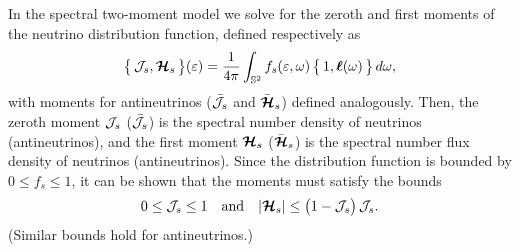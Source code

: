 \documentclass[12pt]{article}
\begin{document}
In the spectral two-moment model we solve for the zeroth and first moments of the neutrino distribution function, defined respectively as
\begin{equation}
  \big\{\,\mathcal{J}_{s},\boldsymbol{\mathcal{H}}_{s}\,\big\}(\varepsilon)=\frac{1}{4\pi}\int_{\mathbb{S}^{2}}f_{s}(\varepsilon,\omega)\,\big\{\,1,\boldsymbol{\ell}(\omega)\,\big\}\,d\omega,
\end{equation}
with moments for antineutrinos ($\bar{\mathcal{J}}_{s}$ and $\bar{\boldsymbol{\mathcal{H}}}_{s}$) defined analogously.  
Then, the zeroth moment $\mathcal{J}_{s}$ ($\bar{\mathcal{J}}_{s}$) is the spectral number density of neutrinos (antineutrinos), and the first moment $\boldsymbol{\mathcal{H}}_{s}$ ($\bar{\boldsymbol{\mathcal{H}}}_{s}$) is the spectral number flux density of neutrinos (antineutrinos).  
Since the distribution function is bounded by $0\le f_{s}\le1$, it can be shown that the moments must satisfy the bounds
\begin{equation}
  0\le\mathcal{J}_{s}\le1
  \quad\text{and}\quad
  |\boldsymbol{\mathcal{H}}_{s}|\le\big(1-\mathcal{J}_{s}\big)\,\mathcal{J}_{s}.  
\end{equation}
(Similar bounds hold for antineutrinos.)
\end{document}
